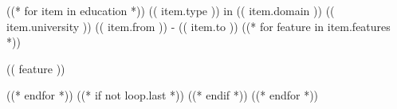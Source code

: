 
((* for item in education *))
  \cveducation
    {(( item.type )) in (( item.domain ))}
    {(( item.university ))}
    {(( item.from )) - (( item.to ))}
    {}
  ((* for feature in item.features *))
    {\small (( feature ))\par}
  ((* endfor *))
  ((* if not loop.last *))
    \divider
  ((* endif *))
((* endfor *))

\smallskip